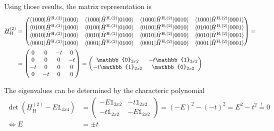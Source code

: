 \documentclass{article}
\begin{document}
{	Using those results, the matrix representation is
		\begin{align*}
			\underline{H}_\text{H}^{(2)} &=
			\begin{pmatrix}
				\braket{ 1000 | \hat{H}^{\text{H},{(2)}} | 1000 } & \braket{1000 | \hat{H}^{\text{H},{(2)}} | 0100 } & \braket{ 1000 | \hat{H}^{\text{H},{(2)}} | 0010 } & \braket{ 1000 | \hat{H}^{\text{H},{(2)}} | 0001 } \\
				\braket{ 0100 | \hat{H}^{\text{H},{(2)}} | 1000 } & \braket{0100 | \hat{H}^{\text{H},{(2)}} | 0100 } & \braket{ 0100 | \hat{H}^{\text{H},{(2)}} | 0010 } & \braket{ 0100 | \hat{H}^{\text{H},{(2)}} | 0001 } \\
				\braket{ 0010 | \hat{H}^{\text{H},{(2)}} | 1000 } & \braket{ 0010 | \hat{H}^{\text{H},{(2)}} | 0100 } & \braket{ 0010 | \hat{H}^{\text{H},{(2)}} | 0010 } & \braket{ 0010 | \hat{H}^{\text{H},{(2)}} | 0001 } \\
				\braket{ 0001 | \hat{H}^{\text{H},{(2)}} | 1000 } & \braket{ 0001 | \hat{H}^{\text{H},{(2)}} | 0100 } & \braket{ 0001 | \hat{H}^{\text{H},{(2)}} | 0010 } & \braket{ 0001 | \hat{H}^{\text{H},{(2)}} | 0001 }
			\end{pmatrix} = \\
			&=
			\begin{pmatrix}
				0 & 0 & -t & 0 \\
				0 & 0 & 0 & -t \\
				-t & 0 & 0 & 0 \\
				0 & -t & 0 & 0
			\end{pmatrix}
			=
			\begin{pmatrix}
				\mathbb{0}_{2x2} & -t\mathbb{1}_{2x2} \\
				-t\mathbb{1}_{2x2} & \mathbb{0}_{2x2}
			\end{pmatrix}
		\end{align*}
	
	The eigenvalues can be determined by the characteric polynomial
		\begin{align*}
			\det(\underline{H}_\text{H}^{(2)} - E\mathbb{1}_{4x4}) &=
			\begin{pmatrix}
				-E \mathbb{1}_{2x2} & -t \mathbb{1}_{2x2} \\
				-t \mathbb{1}_{2x2} & -E \mathbb{1}_{2x2}
			\end{pmatrix}
			= (-E)^2 - (-t)^2 = E^2 - t^2 \stackrel{!}{=} 0 \\
			\Leftrightarrow E &= \pm t
		\end{align*}
	
}
\end{document}
